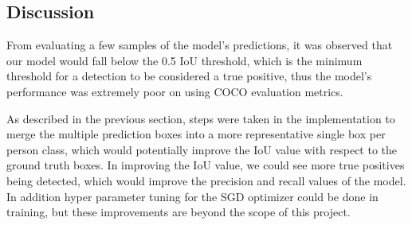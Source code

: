 \subsection{Discussion}

From evaluating a few samples of the model's predictions, it was observed that our model would fall below the 0.5 IoU threshold, which is the minimum threshold for a detection to be considered a true positive, thus the model's performance was extremely poor on using COCO evaluation metrics.

As described in the previous section, steps were taken in the implementation to merge the multiple prediction boxes into a more representative single box per person class, which would potentially improve the IoU value with respect to the ground truth boxes.
In improving the IoU value, we could see more true positives being detected, which would improve the precision and recall values of the model.
In addition hyper parameter tuning for the SGD optimizer could be done in training, but these improvements are beyond the scope of this project.
